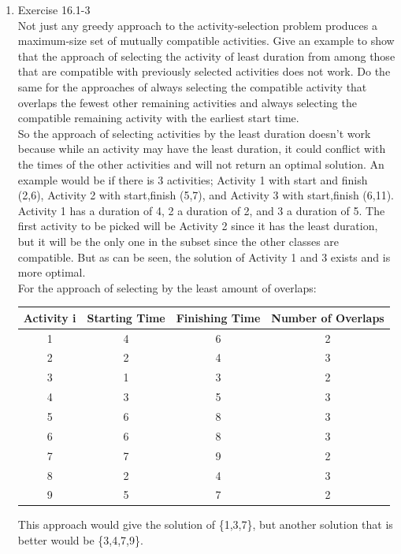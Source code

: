 \documentclass[12pt]{article}
\begin{document}
\begin{enumerate}
\item Exercise 16.1-3 \\
Not just any greedy approach to the activity-selection problem produces a maximum-size set of mutually compatible activities. Give an example to show that the approach of selecting the activity of least duration from among those that are compatible with previously selected activities does not work. Do the same for the approaches of always selecting the compatible activity that overlaps the fewest other remaining activities and always selecting the compatible remaining activity with the earliest start time. \\

So the approach of selecting activities by the least duration doesn't work because while an activity may have the least duration, it could conflict with the times of the other activities and will not return an optimal solution. An example would be if there is 3 activities; Activity 1 with start and finish (2,6), Activity 2 with start,finish (5,7), and Activity 3 with start,finish (6,11). Activity 1 has a duration of  4, 2 a duration of 2, and 3 a duration of 5. The first activity to be picked will be Activity 2 since it has the least duration, but it will be the only one in the subset since the other classes are compatible. But as can be seen, the solution of Activity 1 and 3 exists and is more optimal. \\

For the approach of selecting by the least amount of overlaps:
\begin{center}
 \begin{tabular}{||c c c c||} 
 \hline
 Activity i & Starting Time & Finishing Time & Number of Overlaps\\ [0.5ex] 
 \hline
 1 & 4 & 6 & 2 \\ 
 \hline
 2 & 2 & 4 & 3 \\
 \hline
 3 & 1 & 3 & 2 \\
 \hline
 4 & 3 & 5 & 3 \\
 \hline
 5 & 6 & 8 & 3 \\
 \hline
 6 & 6 & 8 & 3  \\ 
 \hline
 7 & 7 & 9 & 2  \\ 
 \hline
 8 & 2 & 4 & 3  \\
 \hline
 9 & 5 & 7 & 2  \\
 \hline
\end{tabular}
\end{center}

This approach would give the solution of \{1,3,7\}, but another solution that is better would be \{3,4,7,9\}. 


\end{enumerate}
\end{document}
